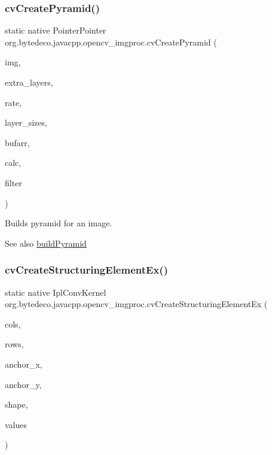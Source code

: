 \subsubsection{\texorpdfstring{cv\+Create\+Pyramid()}{cvCreatePyramid()}}
{\footnotesize\ttfamily static native Pointer\+Pointer org.\+bytedeco.\+javacpp.\+opencv\+\_\+imgproc.\+cv\+Create\+Pyramid (\begin{DoxyParamCaption}\item[{@Const Cv\+Arr}]{img,  }\item[{int}]{extra\+\_\+layers,  }\item[{double}]{rate,  }\item[{@Const Cv\+Size}]{layer\+\_\+sizes,  }\item[{Cv\+Arr}]{bufarr,  }\item[{int}]{calc,  }\item[{int}]{filter }\end{DoxyParamCaption})\hspace{0.3cm}{\ttfamily [static]}}



Builds pyramid for an image. 

\begin{DoxySeeAlso}{See also}
\hyperlink{group__imgproc__filter_ga418b215211fecb0c256c9db02d80dd0e}{build\+Pyramid} 
\end{DoxySeeAlso}
\mbox{\label{group__imgproc__c_ga8a9b8019d4c181721e0f3fbb6c87cb42}} 
\subsubsection{\texorpdfstring{cv\+Create\+Structuring\+Element\+Ex()}{cvCreateStructuringElementEx()}}
{\footnotesize\ttfamily static native Ipl\+Conv\+Kernel org.\+bytedeco.\+javacpp.\+opencv\+\_\+imgproc.\+cv\+Create\+Structuring\+Element\+Ex (\begin{DoxyParamCaption}\item[{int}]{cols,  }\item[{int}]{rows,  }\item[{int}]{anchor\+\_\+x,  }\item[{int}]{anchor\+\_\+y,  }\item[{int}]{shape,  }\item[{Int\+Pointer}]{values }\end{DoxyParamCaption})\hspace{0.3cm}{\ttfamily [static]}}




